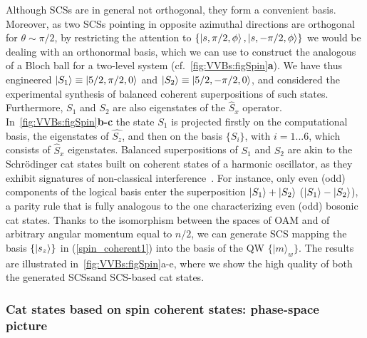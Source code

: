 
Although \acp{SCS} are in general not orthogonal, they form a convenient basis. Moreover, as two \acp{SCS} pointing in opposite azimuthal directions are orthogonal for $\theta\sim\pi/2$, by restricting the attention to $\{\ket{s,\pi/2,\phi},\ket{s,-\pi/2,\phi}\}$ we would be dealing with an orthonormal basis, which we can use to construct the analogous of a Bloch ball for a two-level system (cf.~\cref{fig:VVBs:figSpin}\textbf{a}). We have thus engineered $\ket{S_1}\equiv\ket{5/2,\pi/2,0}$ and $\ket{S_2}\equiv\ket{5/2,-\pi/2,0}$, and considered the experimental synthesis of balanced coherent superpositions of such states.
Furthermore, $S_1$ and $S_2$ are also eigenstates of the $\hat{S}_x$ operator. In~\cref{fig:VVBs:figSpin}\textbf{b-c} the state $S_1$ is projected firstly on the computational basis, the eigenstates of $\hat{S_z}$, and then on the basis $\{S_i\}$, with $i=1...6$, which consists of $\hat{S}_x$ eigenstates. Balanced superpositions of $S_1$ and $S_2$ are akin to the Schrödinger cat states built on coherent states of a harmonic oscillator, as they exhibit signatures of non-classical interference~\cite{agarwal1997atomic,SI}. For instance, only even (odd) components of the logical basis enter the superposition $\ket{S_1}+\ket{S_2}$ ($\ket{S_1}-\ket{S_2}$), a parity rule that is fully analogous to the one characterizing even (odd) bosonic cat states. Thanks to the isomorphism between the spaces of \ac{OAM} and of arbitrary angular momentum equal to $n/2$, we can generate \ac{SCS} mapping the basis $\{ \ket{s_z}\}$ in (\ref{spin_coherent1}) into the basis of the \ac{QW} $\{|m\rangle_w\}$. The results are illustrated in~\cref{fig:VVBs:figSpin}a-e, where we show the high quality of both the generated \acp{SCS}and \ac{SCS}-based cat states. %

\subsubsection{Cat states based on spin coherent states: phase-space picture}

